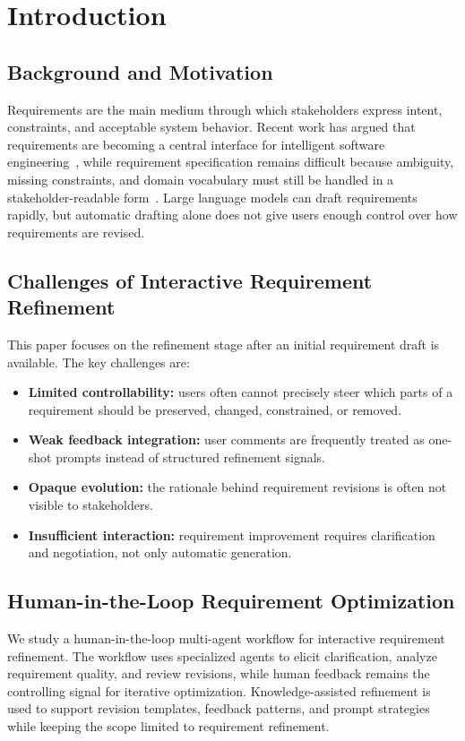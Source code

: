 \section{Introduction}
\label{introduction}

\subsection{Background and Motivation}
\label{subsec:intro-background}
Requirements are the main medium through which stakeholders express intent, constraints, and acceptable system behavior. Recent work has argued that requirements are becoming a central interface for intelligent software engineering~\cite{robinsonRequirementsAreAll2025}, while requirement specification remains difficult because ambiguity, missing constraints, and domain vocabulary must still be handled in a stakeholder-readable form~\cite{darifControlledNaturalLanguage2026}. Large language models can draft requirements rapidly, but automatic drafting alone does not give users enough control over how requirements are revised.

\subsection{Challenges of Interactive Requirement Refinement}
\label{subsec:intro-challenges}
This paper focuses on the refinement stage after an initial requirement draft is available. The key challenges are:
\begin{itemize}[leftmargin=*]
  \item \textbf{Limited controllability:} users often cannot precisely steer which parts of a requirement should be preserved, changed, constrained, or removed.
  \item \textbf{Weak feedback integration:} user comments are frequently treated as one-shot prompts instead of structured refinement signals.
  \item \textbf{Opaque evolution:} the rationale behind requirement revisions is often not visible to stakeholders.
  \item \textbf{Insufficient interaction:} requirement improvement requires clarification and negotiation, not only automatic generation.
\end{itemize}

\subsection{Human-in-the-Loop Requirement Optimization}
\label{subsec:intro-hitl}
We study a human-in-the-loop multi-agent workflow for interactive requirement refinement. The workflow uses specialized agents to elicit clarification, analyze requirement quality, and review revisions, while human feedback remains the controlling signal for iterative optimization. Knowledge-assisted refinement is used to support revision templates, feedback patterns, and prompt strategies while keeping the scope limited to requirement refinement.

